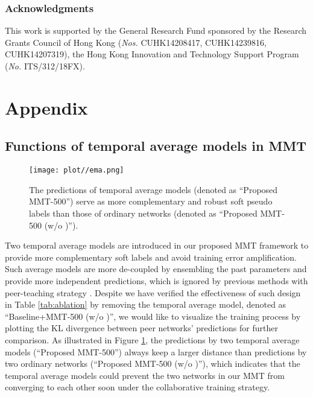 \documentclass{article} \usepackage{iclr2020_conference,times}
\begin{document}
\subsubsection*{Acknowledgments}
This work is supported by the General Research Fund sponsored by the Research Grants Council of Hong Kong (\textit{Nos.} CUHK14208417, CUHK14239816, CUHK14207319), the Hong Kong Innovation and Technology Support Program (\textit{No.} ITS/312/18FX).





\appendix
\section{Appendix}

\subsection{Functions of temporal average models in MMT}
\label{sec:ema}

\begin{figure}[H]
\centering
    \scriptsize
  \begin{center}
    \texttt{[image: plot//ema.png]}
  \end{center}
  \caption{The predictions of temporal average models (denoted as ``Proposed MMT-500'') serve as more complementary and robust soft pseudo labels than those of ordinary networks (denoted as ``Proposed MMT-500 (w/o )'').}
  \label{fig:ema}
\end{figure}
Two temporal average models are introduced in our proposed MMT framework to provide more complementary soft labels and avoid training error amplification.
Such average models are more de-coupled by ensembling the past parameters and provide more independent predictions, which is ignored by previous methods with peer-teaching strategy \citep{han2018co,wang2019co,zhang2018deep}.
Despite we have verified the effectiveness of such design in Table \ref{tab:ablation} by removing the temporal average model, denoted as ``Baseline+MMT-500 (w/o )'',
we would like to visualize the training process by plotting the KL divergence between peer networks' predictions for further comparison.
As illustrated in Figure \ref{fig:ema},
the predictions by two temporal average models (``Proposed MMT-500'') always keep a larger distance than predictions by two ordinary networks (``Proposed MMT-500 (w/o )''),
which indicates that the temporal average models could prevent the two networks in our MMT from converging to each other soon under the collaborative training strategy.
\end{document}

